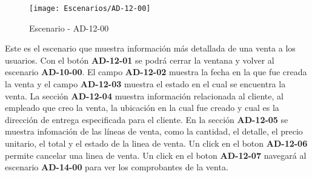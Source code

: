 \begin{figure}[H]
\centering
\texttt{[image: Escenarios/AD-12-00]}
\caption{Escenario - AD-12-00}
\label{fig:AD-12-00}
\end{figure}
Este es el escenario que muestra información más detallada de una venta a los usuarios.
Con el botón \textbf{AD-12-01} se podrá cerrar la ventana y volver al escenario \textbf{AD-10-00}. El campo \textbf{AD-12-02} muestra la fecha en la que fue creada la venta y el campo \textbf{AD-12-03} muestra el estado en el cual se encuentra la venta.
La sección \textbf{AD-12-04} muestra información relacionada al cliente, al empleado que creo la venta, la ubicación en la cual fue creado y cual es la dirección de entrega especificada para el cliente.
En la sección \textbf{AD-12-05} se muestra infomación de las líneas de venta, como la cantidad, el detalle, el precio unitario, el total y el estado de la linea de venta. Un click en el boton \textbf{AD-12-06} permite cancelar una linea de venta. Un click en el boton \textbf{AD-12-07} navegará al escenario \textbf{AD-14-00} para ver los comprobantes de la venta. 
\\